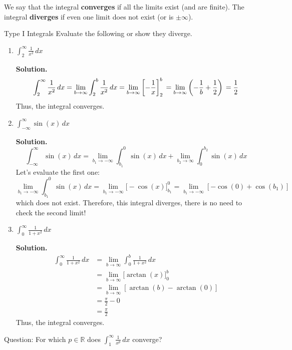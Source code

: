 We say that the integral \textbf{converges} if all the limits exist
(and are finite). The integral \textbf{diverges} if even one limit does
not exist (or is $ \pm\infty $).

\begin{Example}{Type I Integrals}{}
    Evaluate the following or show they diverge.
    \begin{enumerate}[label=(\roman*)]
        \item $ \displaystyle \int_{2}^{\infty} \frac{1}{x^2} \, d{x} $

              \textbf{Solution.}
              \[
                  \int_{2}^{\infty} \frac{1}{x^2} \, d{x}
                  =\lim\limits_{{b} \to {\infty}} \int_{2}^{b} \frac{1}{x^2} \, d{x}       \\
                  = \lim\limits_{{b} \to {\infty}} \left[-\frac{1}{x}  \right]_{2}^b       \\
                  =\lim\limits_{{b} \to {\infty}} \left( -\frac{1}{b} +\frac{1}{2} \right) \\
                  =\frac{1}{2}
              \]
              Thus, the integral converges.
        \item $ \displaystyle \int_{-\infty}^{\infty} \sin(x)\, d{x} $

              \textbf{Solution.}
              \[
                  \int_{-\infty}^{\infty} \sin(x)\, d{x}
                  =\lim\limits_{{b_1} \to {-\infty}} \int_{b_1}^{0} \sin(x)\, d{x}
                  +\lim\limits_{{b_2} \to {\infty}} \int_{0}^{b_2} \sin(x)\, d{x}
              \]
              Let's evaluate the first one:
              \[ \lim\limits_{{b_1} \to {-\infty}}\int_{b_1}^{0} \sin(x)\, d{x}
                  = \lim\limits_{{b_1} \to {-\infty}}\bigl[-\cos(x) \bigr]_{b_1}^0
                  =\lim\limits_{{b_1} \to {-\infty}} \left[-\cos(0)+\cos(b_1)\right] \]
              which does not exist. Therefore, this integral
              diverges, there is no need to check the second limit!
        \item $ \displaystyle \int_{0}^{\infty} \frac{1}{1+x^2}\, d{x} $

              \textbf{Solution.}\begin{align*}
                  \int_{0}^{\infty} \frac{1}{1+x^2}\, d{x}
                   & =\lim\limits_{{b} \to {\infty}} \int_{0}^{b} \frac{1}{1+x^2} \, d{x} \\
                   & = \lim\limits_{{b} \to {\infty}} \bigl[\arctan(x) \bigr]_{0}^b       \\
                   & =\lim\limits_{{b} \to {\infty}} \left[\arctan(b)-\arctan(0) \right]  \\
                   & =\frac{\pi}{2} -0                                                    \\
                   & =\frac{\pi}{2}
              \end{align*}
              Thus, the integral converges.
    \end{enumerate}
\end{Example}
Question: For which $ p\in\mathbb{R} $ does $ \displaystyle \int_{1}^{\infty} \frac{1}{x^p} \, d{x} $
converge?

